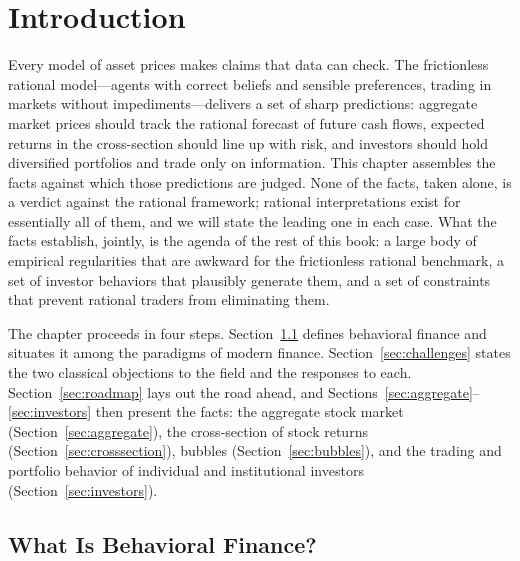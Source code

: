 \chapter{Introduction}
\label{ch:intro}

Every model of asset prices makes claims that data can check. The frictionless rational model---agents with correct beliefs and sensible preferences, trading in markets without impediments---delivers a set of sharp predictions: aggregate market prices should track the rational forecast of future cash flows, expected returns in the cross-section should line up with risk, and investors should hold diversified portfolios and trade only on information. This chapter assembles the facts against which those predictions are judged. None of the facts, taken alone, is a verdict against the rational framework; rational interpretations exist for essentially all of them, and we will state the leading one in each case. What the facts establish, jointly, is the agenda of the rest of this book: a large body of empirical regularities that are awkward for the frictionless rational benchmark, a set of investor behaviors that plausibly generate them, and a set of constraints that prevent rational traders from eliminating them.

The chapter proceeds in four steps. Section~\ref{sec:whatis} defines behavioral finance and situates it among the paradigms of modern finance. Section~\ref{sec:challenges} states the two classical objections to the field and the responses to each. Section~\ref{sec:roadmap} lays out the road ahead, and Sections~\ref{sec:aggregate}--\ref{sec:investors} then present the facts: the aggregate stock market (Section~\ref{sec:aggregate}), the cross-section of stock returns (Section~\ref{sec:crosssection}), bubbles (Section~\ref{sec:bubbles}), and the trading and portfolio behavior of individual and institutional investors (Section~\ref{sec:investors}).

\section{What Is Behavioral Finance?}
\label{sec:whatis}


